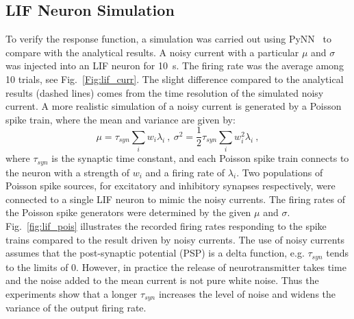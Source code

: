 	\subsection{LIF Neuron Simulation}
	To verify the response function, a simulation was carried out using PyNN~\cite{davison2008pynn} to compare with the analytical results.
	A noisy current with a particular $\mu$ and $\sigma$ was injected into an LIF neuron for 10~s.
	The firing rate was the average among 10 trials, see Fig.~\ref{Fig:lif_curr}.
	The slight difference compared to the analytical results (dashed lines) comes from the time resolution of the simulated noisy current.
	A more realistic simulation of a noisy current is generated by a Poisson spike train, 
	where the mean and variance are given by:
	\begin{equation}
	\mu = \tau_{syn}\sum_i w_i\lambda_{i}~,~\sigma^2=\frac{1}{2}\tau_{syn}\sum_i w_i^2\lambda_{i}~,
	\end{equation}
	where $\tau_{syn}$ is the synaptic time constant, and each Poisson spike train connects to the neuron with a strength of $w_i$ and a firing rate of $\lambda_i$.
	Two populations of Poisson spike sources, for excitatory and inhibitory synapses respectively, were connected to a single LIF neuron to mimic the noisy currents.
	The firing rates of the Poisson spike generators were determined by the given $\mu$ and $\sigma$.
	Fig.~\ref{fig:lif_pois} illustrates the recorded firing rates responding to the spike trains compared to the result driven by noisy currents.
	The use of noisy currents assumes that the post-synaptic potential (PSP) is a delta function, e.g. $\tau_{syn}$ tends to the limits of 0.
	However, in practice the release of neurotransmitter takes time and the noise added to the mean current is not pure white noise.
	Thus the experiments show that a longer $\tau_{syn}$ increases the level of noise and widens the variance of the output firing rate.
	
